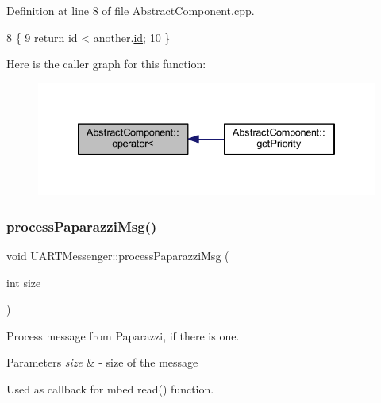 Definition at line 8 of file Abstract\+Component.\+cpp.


\begin{DoxyCode}
8                                                                         \{
9     \textcolor{keywordflow}{return} \textcolor{keywordtype}{id} < another.\hyperlink{class_abstract_component_a9c9c548149681b1a1dd935e66ed5dd11}{id};
10 \}
\end{DoxyCode}
Here is the caller graph for this function\+:
\nopagebreak
\begin{figure}[H]
\begin{center}
\leavevmode
\includegraphics[width=334pt]{class_abstract_component_a0c2e458144111c5f599c66f168516abc_icgraph}
\end{center}
\end{figure}
\mbox{\label{class_u_a_r_t_messenger_a3ae1cd91810b34f89244cd157c436c3c}} 
\subsubsection{\texorpdfstring{process\+Paparazzi\+Msg()}{processPaparazziMsg()}}
{\footnotesize\ttfamily void U\+A\+R\+T\+Messenger\+::process\+Paparazzi\+Msg (\begin{DoxyParamCaption}\item[{int}]{size }\end{DoxyParamCaption})\hspace{0.3cm}{\ttfamily [private]}}



Process message from Paparazzi, if there is one. 


\begin{DoxyParams}{Parameters}
{\em size} & -\/ size of the message\\
\hline
\end{DoxyParams}
Used as callback for mbed read() function. 

